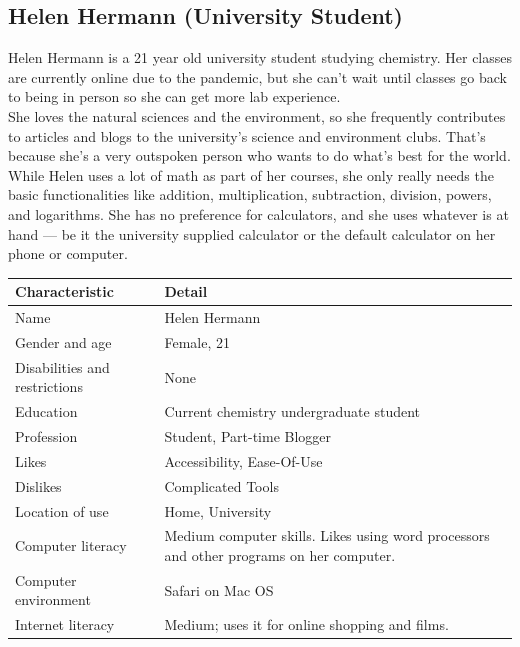 \documentclass[11pt,onside]{report}
\begin{document}
\subsection{Helen Hermann (University Student)}
Helen Hermann is a 21 year old university student studying chemistry. Her classes are currently online due to the pandemic, but she can’t wait until classes go back to being in person so she can get more lab experience. \\

She loves the natural sciences and the environment, so she frequently contributes to articles and blogs to the university’s science and environment clubs. That’s because she’s a very outspoken person who wants to do what’s best for the world.  \\

While Helen uses a lot of math as part of her courses, she only really needs the basic functionalities like addition, multiplication, subtraction, division, powers, and logarithms. She has no preference for calculators, and she uses whatever is at hand — be it the university supplied calculator or the default calculator on her phone or computer.
\begin{center}
    \begin{tabular}{|p{4cm}|p{10cm}|}
        \hline
        \bf{Characteristic} & \bf{Detail} \\
        \hline
        Name &  Helen Hermann \\
        \hline
        Gender and age & Female, 21 \\
        \hline
        Disabilities and restrictions & None \\
        \hline
        Education & Current chemistry undergraduate student \\
        \hline
        Profession & Student, Part-time Blogger \\
        \hline
        Likes & Accessibility, Ease-Of-Use \\
        \hline
        Dislikes & Complicated Tools \\
        \hline
        Location of use & Home, University \\
        \hline
        Computer literacy & Medium computer skills. Likes using word processors and other programs on her computer. \\
        \hline
        Computer environment &  Safari on Mac OS \\
        \hline
        Internet literacy &  Medium; uses it for online shopping and films. \\
        \hline
    \end{tabular}
\end{center}
\end{document}
